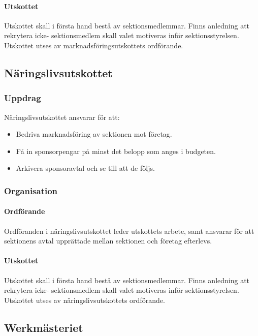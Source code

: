 \documentclass{datateknologsektionen-document}
\begin{document}
\paragraph{Utskottet}
Utskottet skall i första hand bestå av sektionsmedlemmar. Finns anledning att rekrytera icke- sektionsmedlem skall valet motiveras inför sektionsstyrelsen. Utskottet utses av marknadsföringsutskottets ordförande.

\subsection{Näringslivsutskottet}
\label{naru}
\subsubsection{Uppdrag}
Näringslivsutskottet ansvarar för att:
\begin{itemize}
  \item Bedriva marknadsföring av sektionen mot företag.
  \item Få in sponsorpengar på minst det belopp som anges i budgeten.
  \item Arkivera sponsoravtal och se till att de följs.
\end{itemize}
\subsubsection{Organisation}
\paragraph{Ordförande}
Ordföranden i näringslivsutskottet leder utskottets arbete, samt ansvarar för att sektionens
avtal upprättade mellan sektionen och företag efterlevs.
\paragraph{Utskottet}

Utskottet skall i första hand bestå av sektionsmedlemmar. Finns anledning att rekrytera icke-
sektionsmedlem skall valet motiveras inför sektionsstyrelsen. Utskottet utses av
näringslivsutskottets ordförande.

\subsection{Werkmästeriet}
\label{werk}
\end{document}
